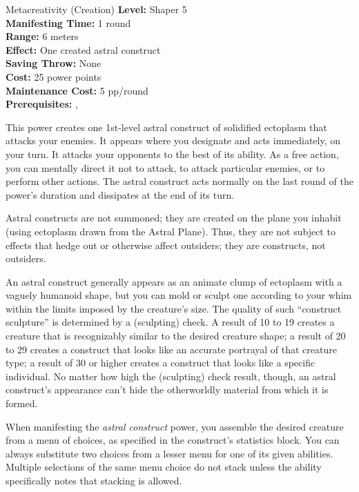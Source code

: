 {Metacreativity (Creation)}
{
	\textbf{Level:}
	Shaper 5\\
	\textbf{Manifesting Time:}
	1 round\\
	\textbf{Range:}
	6 meters\\
	\textbf{Effect:}
	One created astral construct\\
	\textbf{Saving Throw:}
	None\\
	\textbf{Cost:}
	25 power points\\
	\textbf{Maintenance Cost:}
	5 pp/round\\
	\textbf{Prerequisites:}
	, \\
}
{
	This power creates one 1st-level astral construct of solidified ectoplasm that attacks your enemies. It appears where you designate and acts immediately, on your turn. It attacks your opponents to the best of its ability. As a free action, you can mentally direct it not to attack, to attack particular enemies, or to perform other actions. The astral construct acts normally on the last round of the power's duration and dissipates at the end of its turn.

	Astral constructs are not summoned; they are created on the plane you inhabit (using ectoplasm drawn from the Astral Plane). Thus, they are not subject to effects that hedge out or otherwise affect outsiders; they are constructs, not outsiders.

	An astral construct generally appears as an animate clump of ectoplasm with a vaguely humanoid shape, but you can mold or sculpt one according to your whim within the limits imposed by the creature's size. The quality of such ``construct sculpture'' is determined by a  (sculpting) check. A result of 10 to 19 creates a creature that is recognizably similar to the desired creature shape; a result of 20 to 29 creates a construct that looks like an accurate portrayal of that creature type; a result of 30 or higher creates a construct that looks like a specific individual. No matter how high the  (sculpting) check result, though, an astral construct's appearance can't hide the otherworldly material from which it is formed. 

	When manifesting the \emph{astral construct} power, you assemble the desired creature from a menu of choices, as specified in the construct's statistics block. You can always substitute two choices from a lesser menu for one of its given abilities. Multiple selections of the same menu choice do not stack unless the ability specifically notes that stacking is allowed.

}

